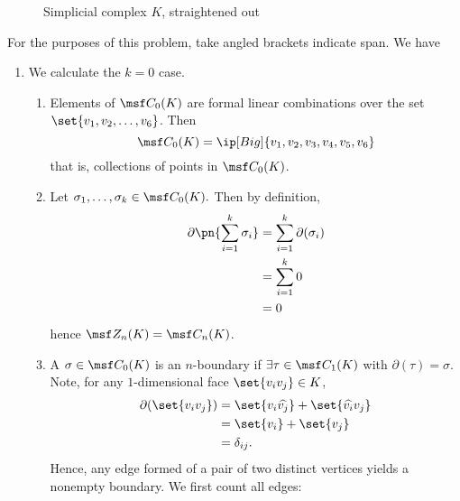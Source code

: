 \begin{solution}
\begin{figure}[H]
    \caption{Simplicial complex $K$, straightened out}
  \end{figure}
  For the purposes of this problem, take angled brackets indicate span. We have
  \begin{enumerate}[label=(\roman*)]
    \item We calculate the $k=0$ case.
      \begin{enumerate}
        \item Elements of $\msf C_0(K)$ are formal linear combinations over the
          set $\set{v_1, v_2, \ldots, v_6}$. Then
          \[
            \msf C_0(K) = \ip[Big]{v_1, v_2, v_3, v_4, v_5, v_6}
          \]
          that is, collections of points in $\msf C_0(K)$.
        \item Let $\sigma_1, \ldots, \sigma_k \in \msf C_0(K).$ Then by definition,
          \begin{align*}
            \partial\pn{\sum_{i=1}^k \sigma_i}
            &= \sum_{i=1}^k \partial(\sigma_i)\\
            &= \sum_{i=1}^k 0 \\
            &= 0
          \end{align*}
          hence $\msf Z_n(K) = \msf C_n(K)$.
        \item A $\sigma \in \msf C_0(K)$ is an $n$-boundary if $\exists \tau \in
          \msf C_{1}(K)$ with $\partial(\tau) = \sigma$. Note, for any
          $1$-dimensional face $\set{v_iv_j} \in K$,
          \begin{align*}
            \partial(\set{v_iv_j})
            &= \set{v_i \widehat{v_j}} + \set{\widehat{v_i}v_j} \\
            &= \set{v_i} + \set{v_j} \\
            &= \delta_{ij}.
          \end{align*}
          Hence, any edge formed of a pair of two distinct vertices yields a
          nonempty boundary. We first count all edges:
          \begin{figure}[H]
            \centering
            \begin{tikzpicture}[
              scale = .6,
              every node/.style={
                circle,
                draw=black,
                fill=white,
                inner sep=0pt,
                minimum size=7pt
              }
              ]


\end{tikzpicture}
\end{figure}
\end{enumerate}
\end{enumerate}
\end{solution}
